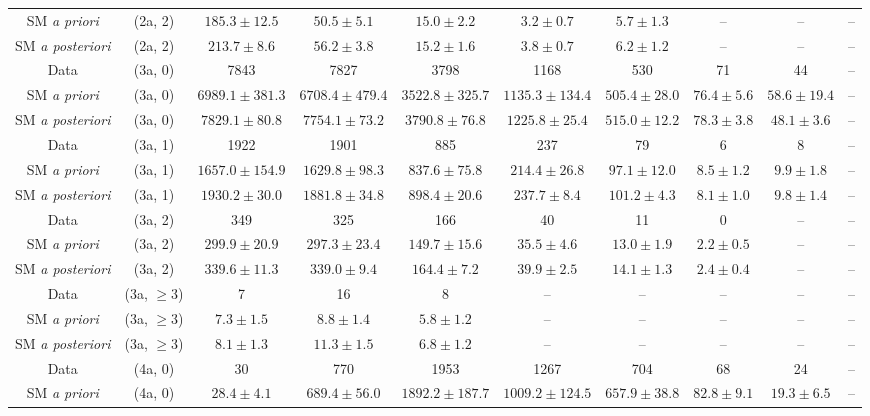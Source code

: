 \begin{table}[h!]
{\begin{tabular}{cccccccccc}
	SM \textit{a priori} & (2a, 2) & $185.3\pm 12.5$ & $50.5\pm 5.1$ & $15.0\pm 2.2$ & $3.2\pm 0.7$ & $5.7\pm 1.3$ & -- & -- & -- \\[0.5ex] 
	SM \textit{a posteriori} & (2a, 2) & $213.7\pm 8.6$ & $56.2\pm 3.8$ & $15.2\pm 1.6$ & $3.8\pm 0.7$ & $6.2\pm 1.2$ & -- & -- & -- \\[0.5ex] 
	Data & (3a, 0) & 7843 & 7827 & 3798 & 1168 & 530 & 71 & 44 & -- \\[0.5ex] 
	SM \textit{a priori} & (3a, 0) & $6989.1\pm 381.3$ & $6708.4\pm 479.4$ & $3522.8\pm 325.7$ & $1135.3\pm 134.4$ & $505.4\pm 28.0$ & $76.4\pm 5.6$ & $58.6\pm 19.4$ & -- \\[0.5ex] 
	SM \textit{a posteriori} & (3a, 0) & $7829.1\pm 80.8$ & $7754.1\pm 73.2$ & $3790.8\pm 76.8$ & $1225.8\pm 25.4$ & $515.0\pm 12.2$ & $78.3\pm 3.8$ & $48.1\pm 3.6$ & -- \\[0.5ex] 
	Data & (3a, 1) & 1922 & 1901 & 885 & 237 & 79 & 6 & 8 & -- \\[0.5ex] 
	SM \textit{a priori} & (3a, 1) & $1657.0\pm 154.9$ & $1629.8\pm 98.3$ & $837.6\pm 75.8$ & $214.4\pm 26.8$ & $97.1\pm 12.0$ & $8.5\pm 1.2$ & $9.9\pm 1.8$ & -- \\[0.5ex] 
	SM \textit{a posteriori} & (3a, 1) & $1930.2\pm 30.0$ & $1881.8\pm 34.8$ & $898.4\pm 20.6$ & $237.7\pm 8.4$ & $101.2\pm 4.3$ & $8.1\pm 1.0$ & $9.8\pm 1.4$ & -- \\[0.5ex] 
	Data & (3a, 2) & 349 & 325 & 166 & 40 & 11 & 0 & -- & -- \\[0.5ex] 
	SM \textit{a priori} & (3a, 2) & $299.9\pm 20.9$ & $297.3\pm 23.4$ & $149.7\pm 15.6$ & $35.5\pm 4.6$ & $13.0\pm 1.9$ & $2.2\pm 0.5$ & -- & -- \\[0.5ex] 
	SM \textit{a posteriori} & (3a, 2) & $339.6\pm 11.3$ & $339.0\pm 9.4$ & $164.4\pm 7.2$ & $39.9\pm 2.5$ & $14.1\pm 1.3$ & $2.4\pm 0.4$ & -- & -- \\[0.5ex] 
	Data & (3a, $\ge3$) & 7 & 16 & 8 & -- & -- & -- & -- & -- \\[0.5ex] 
	SM \textit{a priori} & (3a, $\ge3$) & $7.3\pm 1.5$ & $8.8\pm 1.4$ & $5.8\pm 1.2$ & -- & -- & -- & -- & -- \\[0.5ex] 
	SM \textit{a posteriori} & (3a, $\ge3$) & $8.1\pm 1.3$ & $11.3\pm 1.5$ & $6.8\pm 1.2$ & -- & -- & -- & -- & -- \\[0.5ex] 
	Data & (4a, 0) & 30 & 770 & 1953 & 1267 & 704 & 68 & 24 & -- \\[0.5ex] 
	SM \textit{a priori} & (4a, 0) & $28.4\pm 4.1$ & $689.4\pm 56.0$ & $1892.2\pm 187.7$ & $1009.2\pm 124.5$ & $657.9\pm 38.8$ & $82.8\pm 9.1$ & $19.3\pm 6.5$ & -- \\[0.5ex] 

\end{tabular}}
\end{table}
